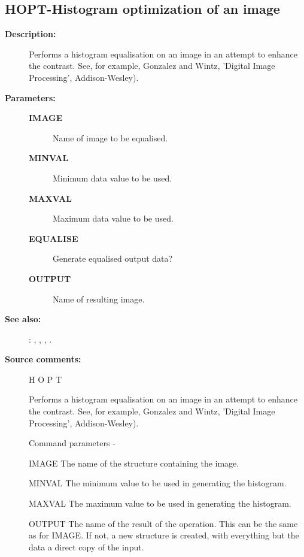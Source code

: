 \begin{description}
\subsection{HOPT-\label{HOPT}Histogram optimization of an image}
\begin{description}

\item [\textbf{Description:}]
 Performs a histogram equalisation on an image in an attempt
 to enhance the contrast.  See, for example, Gonzalez and
 Wintz, 'Digital Image Processing', Addison-Wesley).

\item [\textbf{Parameters:}]
\begin{description}
\item [\textbf{IMAGE}]
 Name of image to be equalised.
\item [\textbf{MINVAL}]
 Minimum data value to be used.
\item [\textbf{MAXVAL}]
 Maximum data value to be used.
\item [\textbf{EQUALISE}]
 Generate equalised output data?
\item [\textbf{OUTPUT}]
 Name of resulting image.
\end{description}

\item [\textbf{See also:}]
: , , , .\\

\item [\textbf{Source comments:}]
\begin{terminalv}
 H O P T

 Performs a histogram equalisation on an image in an attempt
 to enhance the contrast.  See, for example, Gonzalez and
 Wintz, 'Digital Image Processing', Addison-Wesley).

 Command parameters -

 IMAGE  The name of the structure containing the image.

 MINVAL The minimum value to be used in generating the
        histogram.

 MAXVAL The maximum value to be used in generating the
        histogram.

 OUTPUT The name of the result of the operation.  This can
        be the same as for IMAGE.  If not, a new structure
        is created, with everything but the data a direct
        copy of the input.


\end{terminalv}
\end{description}
\end{description}
